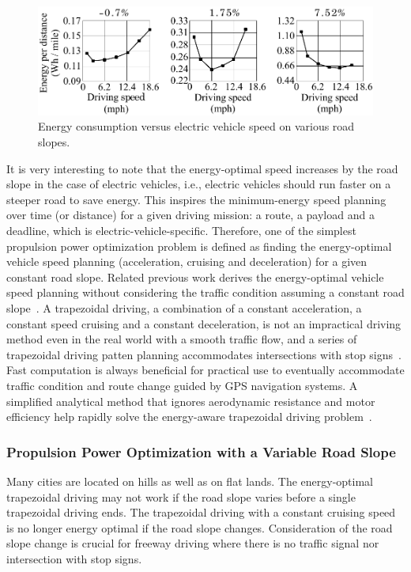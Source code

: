 \begin{figure}
\centering
\includegraphics[width=1.0\hsize]{Figures/Naehyuck_Chang/energy_consumption_by_velocity.pdf}
\caption{Energy consumption versus electric vehicle speed on various road slopes.}
\label{fig:energy_vs_vel}
\end{figure}      

It is very interesting to note that the energy-optimal speed increases by the road slope in the case of electric vehicles, i.e., electric vehicles should run faster on a steeper road to save energy. This inspires the minimum-energy speed planning over time (or distance) for a given driving mission: a route, a payload and a deadline, which is electric-vehicle-specific. Therefore, one of the simplest propulsion power optimization problem is defined as finding the energy-optimal vehicle speed planning (acceleration, cruising and deceleration) for a given constant road slope.
Related previous work derives the energy-optimal vehicle speed planning without considering the traffic condition assuming a constant road slope~\cite{Yan:NAPS14,Dib:CEP14}. A trapezoidal driving, a combination of a constant acceleration, a constant speed cruising and a constant deceleration, is not an impractical driving method even in the real world with a smooth traffic flow, and a series of trapezoidal driving patten planning accommodates intersections with stop signs~\cite{Yan:NAPS14}. Fast computation is always beneficial for practical use to eventually accommodate traffic condition and route change guided by GPS navigation systems. A simplified analytical method that ignores aerodynamic resistance and motor efficiency help rapidly solve the energy-aware trapezoidal driving problem~\cite{Dib:CEP14}.

\subsubsection{Propulsion Power Optimization with a Variable Road Slope} \label{subsubsec:opt_variable_slope}

Many cities are located on hills as well as on flat lands. The energy-optimal trapezoidal driving may not work if the road slope varies before a single trapezoidal driving ends. The trapezoidal driving with a constant cruising speed is no longer energy optimal if the road slope changes. Consideration of the road slope change is crucial for freeway driving where there is no traffic signal nor intersection with stop signs.

